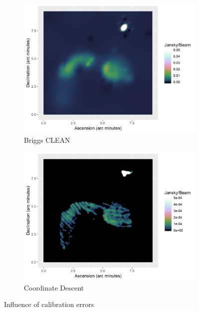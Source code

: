 \begin{figure}[h]
	\centering
	\begin{subfigure}[b]{0.45\linewidth}
		\includegraphics[width=1.00\linewidth]{./chapters/10.results/MSClean/Briggs-Calibration.png}
		\caption{Briggs CLEAN}
	\end{subfigure}
	\begin{subfigure}[b]{0.45\linewidth}
		\includegraphics[width=1.00\linewidth]{./chapters/10.results/SerialCD/CD-Calibration.png}
		\caption{Coordinate Descent}
	\end{subfigure}
	\caption{Influence of calibration errors}
	\label{results:cleancomp::calib:figure}
\end{figure}


